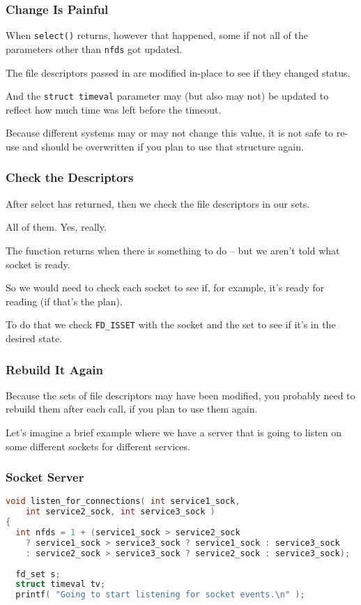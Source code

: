 \begin{frame}
	\frametitle{Change Is Painful}

	When \texttt{select()} returns, however that happened, some if not all of the parameters other than \texttt{nfds} got updated.

	The file descriptors passed in are modified in-place to see if they changed status.

	And the \texttt{struct timeval} parameter may (but also may not) be updated to reflect how much time was left before the timeout.

	Because different systems may or may not change this value, it is not safe to re-use and should be overwritten if you plan to use that structure again.

\end{frame}


\begin{frame}
	\frametitle{Check the Descriptors}

	After select has returned, then we check the file descriptors in our sets.

	All of them. Yes, really.

	The function returns when there is something to do -- but we aren't told what socket is ready.

	So we would need to check each socket to see if, for example, it's ready for reading (if that's the plan).

	To do that we check \texttt{FD\_ISSET} with the socket and the set to see if it's in the desired state.

\end{frame}

\begin{frame}
	\frametitle{Rebuild It Again}

	Because the sets of file descriptors may have been modified, you probably need to rebuild them after each call, if you plan to use them again.

	Let's imagine a brief example where we have a server that is going to listen on some different sockets for different services.

\end{frame}


\begin{frame}[fragile]
	\frametitle{Socket Server}

	\begin{lstlisting}[language=C]
void listen_for_connections( int service1_sock, 
    int service2_sock, int service3_sock ) 
{
  int nfds = 1 + (service1_sock > service2_sock
    ? service1_sock > service3_sock ? service1_sock : service3_sock
    : service2_sock > service3_sock ? service2_sock : service3_sock);
    
  fd_set s;
  struct timeval tv;
  printf( "Going to start listening for socket events.\n" );
\end{lstlisting}

\end{frame}

